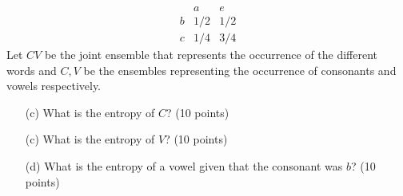 \noindent\[
\begin{array}{c|c|c}  & a & e  \\\hline b & 1/2 &1/2 \\\hline c & 1/4 &3/4 \end{array}
\]
Let $CV$ be the joint ensemble that represents the occurrence of the different words and $C,V$ be the ensembles representing the occurrence of consonants and vowels respectively.
\begin{enumerate}
\item[(c)] What is the entropy of $C$? (10 points) %

\noindent{}

\item[(c)] What is the entropy of $V$? (10 points) 

\noindent{}

\item[(d)] What is the entropy of a vowel given that the consonant was $b$? (10 points) 

\noindent{}
\end{enumerate}

